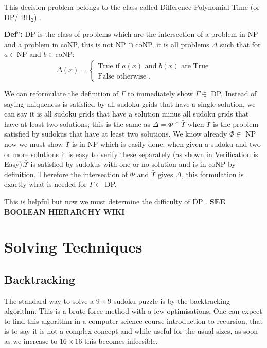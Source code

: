 \documentclass[a4paper,11pt]{report}
\begin{document}
This decision problem belongs to the class called Difference Polynomial Time (or DP/ BH$_2$) \cite{dpcomplexity}.

\textbf{Def$^n$:} DP is the class of problems which are the intersection of a problem in NP and a problem in coNP, this is not NP $\cap$ coNP, it is all problems $\Delta$ such that for $a \in $NP and $b\in $coNP:
		\begin{equation}
		        \Delta (x) = \begin{cases}
		            \text{True if $a(x)$ and $b(x)$ are True} \\
		            \text{False otherwise }.
				\end{cases}
		\end{equation}

We can reformulate the definition of $\Gamma$ to immediately show $\Gamma\in$ DP. Instead of saying uniqueness is satisfied by all sudoku grids that have a single solution, we can say it is all sudoku grids that have a solution minus all sudoku grids that have at least two solutions; this is the same as $\Delta = \Phi \cap \bar{\Upsilon}$ when $\Upsilon$ is the problem satisfied by sudokus that have at least two solutions. We know already $\Phi\in$ NP now we must show $\Upsilon$ is in NP which is easily done; when given a sudoku and two or more solutions it is easy to verify these separately (as shown in Verification is Easy).$\bar{\Upsilon}$ is satisfied by sudokus with one or no solution and is in coNP by definition. Therefore the intersection of $\Phi$ and $\bar{\Upsilon}$ gives $\Delta$, this formulation is exactly what is needed for $\Gamma\in$ DP.

This is helpful but now we must determine the difficulty of DP \cite{dphardness}. \textbf{SEE BOOLEAN HIERARCHY WIKI}
		

\chapter{Solving Techniques}

\section{Backtracking}
The standard way to solve a $9 \times 9$ sudoku puzzle is by the backtracking algorithm. This is a brute force method with a few optimisations. One can expect to find this algorithm in a computer science course introduction to recursion, that is to say
it is not a complex concept and while useful for the usual sizes, as soon as we increase to $16 \times 16$ this becomes infeesible.
\end{document}
